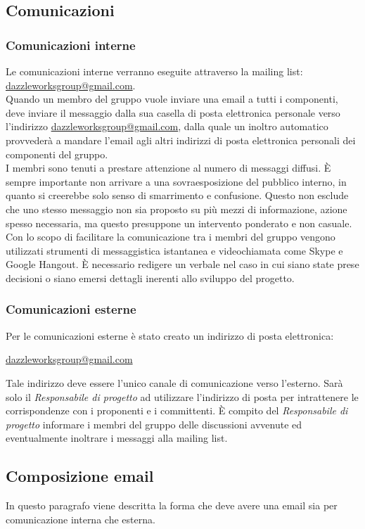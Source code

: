	\subsection{Comunicazioni}
		\subsubsection{Comunicazioni interne}
Le comunicazioni interne verranno eseguite attraverso la \gls{mailing list}: \url{dazzleworksgroup@gmail.com}. \\ 
Quando un membro del gruppo vuole inviare una email a tutti i componenti, deve inviare il messaggio dalla sua casella di posta elettronica personale verso l'indirizzo \url{dazzleworksgroup@gmail.com}, dalla quale un inoltro automatico provvederà a mandare l'email agli altri indirizzi di posta elettronica personali dei componenti del gruppo.\\ 
I membri sono tenuti a prestare attenzione al numero di messaggi diffusi. È sempre importante non arrivare a una sovraesposizione del pubblico interno, in quanto si creerebbe solo senso di smarrimento e confusione. Questo non esclude che uno stesso messaggio non sia proposto su più mezzi di informazione, azione spesso necessaria, ma questo presuppone un intervento ponderato e non casuale.\\
Con lo scopo di facilitare la comunicazione tra i membri del gruppo vengono utilizzati strumenti di messaggistica istantanea e videochiamata come Skype e Google Hangout.
È necessario redigere un \gls{verbale} nel caso in cui siano state prese decisioni o siano emersi dettagli inerenti allo sviluppo del progetto. 
		\subsubsection{Comunicazioni esterne}
Per le comunicazioni esterne è stato creato un indirizzo di posta elettronica:
\begin{center}
\url{dazzleworksgroup@gmail.com}
\end{center}
Tale indirizzo deve essere l'unico canale di comunicazione verso l'esterno. Sarà solo il \textit{Responsabile di progetto} ad utilizzare l'indirizzo di posta per intrattenere le corrispondenze con i proponenti e i committenti. È compito del \textit{Responsabile di progetto} informare i membri del gruppo delle discussioni avvenute ed eventualmente inoltrare i messaggi alla \gls{mailing list}.

	\subsection{Composizione email}
In questo paragrafo viene descritta la forma che deve avere una email sia per comunicazione interna che esterna.
